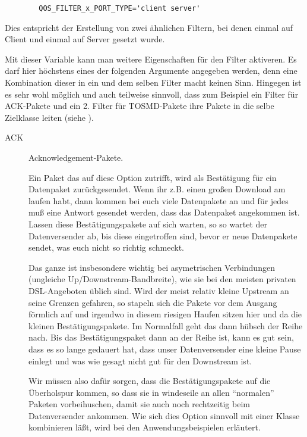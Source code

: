 \begin{description}
\begin{example}
\begin{verbatim}
        QOS_FILTER_x_PORT_TYPE='client server'
\end{verbatim}
\end{example}

   Dies entspricht der Erstellung von zwei ähnlichen Filtern, bei denen
    einmal auf Client und einmal auf Server gesetzt
   wurde.



   Mit dieser Variable kann man weitere Eigenschaften für den Filter
   aktiveren. Es darf hier höchstens eines der folgenden Argumente
   angegeben werden, denn eine Kombination dieser in ein und dem selben
   Filter macht keinen Sinn. Hingegen ist es sehr wohl möglich und auch
   teilweise sinnvoll, dass zum Beispiel ein Filter für ACK-Pakete und ein
   2. Filter für TOSMD-Pakete ihre Pakete in die selbe Zielklasse leiten
   (siehe ).

   \begin{description}
   \item[ACK] Acknowledgement-Pakete.

   Ein Paket das auf diese Option zutrifft, wird als Bestätigung für ein 
   Datenpaket zurückgesendet. Wenn ihr z.B. einen großen Download am
   laufen habt, dann kommen bei euch viele Datenpakete an und für jedes
   muß eine Antwort gesendet werden, dass das Datenpaket angekommen ist.
   Lassen diese Bestätigungspakete auf sich warten, so so wartet der
   Datenversender ab, bis diese eingetroffen sind, bevor er neue
   Datenpakete sendet, was euch nicht so richtig schmeckt.

   Das ganze ist insbesondere wichtig bei asymetrischen Verbindungen
   (ungleiche Up/Downstream-Bandbreite), wie sie bei den meisten privaten
   DSL-Angeboten üblich sind. Wird der meist relativ kleine Upstream an
   seine Grenzen gefahren, so stapeln sich die Pakete vor dem Ausgang
   förmlich auf und irgendwo in diesem riesigen Haufen sitzen hier und da
   die kleinen Bestätigungspakete. Im Normalfall geht das dann hübsch der
   Reihe nach. Bis das Bestätigungspaket dann an der Reihe ist, kann es
   gut sein, dass es so lange gedauert hat, dass unser Datenversender eine
   kleine Pause einlegt und was wie gesagt nicht gut für den Downstream
   ist.

   Wir müssen also dafür sorgen, dass die Bestätigungspakete auf die
   Überholspur kommen, so dass sie in windeseile an allen ``normalen''
   Paketen vorbeihuschen, damit sie auch noch rechtzeitig beim
   Datenversender ankommen. Wie sich dies Option sinnvoll mit einer
   Klasse kombinieren läßt, wird bei den Anwendungsbeispielen
   erläutert.



\end{description}
\end{description}
